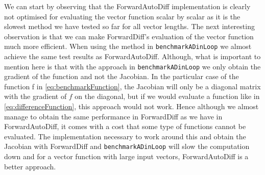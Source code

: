 We can start by observing that the ForwardAutoDiff implementation is clearly not optimised for evaluating the vector function scalar by scalar as it is the slowest method we have tested so far for all vector lengths. The next interesting observation is that we can make ForwardDiff's evaluation of the vector function much more efficient. When using the method in \texttt{benchmarkADinLoop} we almost achieve the same test results as ForwardAutoDiff. Although, what is important to mention here is that with the approach in \texttt{benchmarkADinLoop} we only obtain the gradient of the function and not the Jacobian. In the particular case of the function f in \eqref{eq:benchmarkFunction}, the Jacobian will only be a diagonal matrix with the gradient of $f$ on the diagonal, but if we would evaluate a function like in \eqref{eq:differenceFunction}, this approach would not work. Hence although we almost manage to obtain the same performance in ForwardDiff as we have in ForwardAutoDiff, it comes with a cost that some type of functions cannot be evaluated. The implementation necessary to work around this and obtain the Jacobian with ForwardDiff and \texttt{benchmarkADinLoop} will slow the computation down and for a vector function with large input vectors, ForwardAutoDiff is a better approach. 

